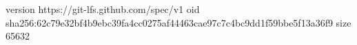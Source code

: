 version https://git-lfs.github.com/spec/v1
oid sha256:62c79e32bf4b9ebc39fa4cc0275af44463cae97c7c4bc9dd1f59bbe5f13a36f9
size 65632
